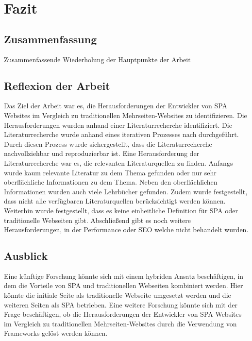 \section{Fazit}

\subsection{Zusammenfassung}
Zusammenfassende Wiederholung der Hauptpunkte der Arbeit
\subsection{Reflexion der Arbeit}
Das Ziel der Arbeit war es, die Herausforderungen der Entwickler von \ac{SPA} Websites im Vergleich zu traditionellen Mehrseiten-Websites zu identifizieren.
Die Herausforderungen wurden anhand einer Literaturrecherche identifiziert.
Die Literaturrecherche wurde anhand eines iterativen Prozesses nach  durchgeführt.
Durch diesen Prozess wurde sichergestellt, dass die Literaturrecherche nachvollziehbar und reproduzierbar ist.
Eine Herausforderung der Literaturrecherche war es, die relevanten Literaturquellen zu finden.
Anfangs wurde kaum relevante Literatur zu dem Thema gefunden oder nur sehr oberflächliche Informationen zu dem Thema.
Neben den oberflächlichen Informationen wurden auch viele Lehrbücher gefunden.
Zudem wurde festgestellt, dass nicht alle verfügbaren Literaturquellen berücksichtigt werden können.
Weiterhin wurde festgestellt, dass es keine einheitliche Definition für \ac{SPA} oder traditionelle Webseiten gibt.
Abschließend gibt es noch weitere Herausforderungen, in der Performance oder \ac{SEO} welche nicht behandelt wurden.
\subsection{Ausblick}
Eine künftige Forschung könnte sich mit einem hybriden Ansatz beschäftigen, in dem die Vorteile von \ac{SPA} und traditionellen Webseiten kombiniert werden.
Hier könnte die initiale Seite als traditionelle Webseite umgesetzt werden und die weiteren Seiten als \ac{SPA} betrieben.
Eine weitere Forschung könnte sich mit der Frage beschäftigen,
ob die Herausforderungen der Entwickler von \ac{SPA} Websites im Vergleich zu traditionellen Mehrseiten-Websites durch die Verwendung von Frameworks gelöst werden können.
